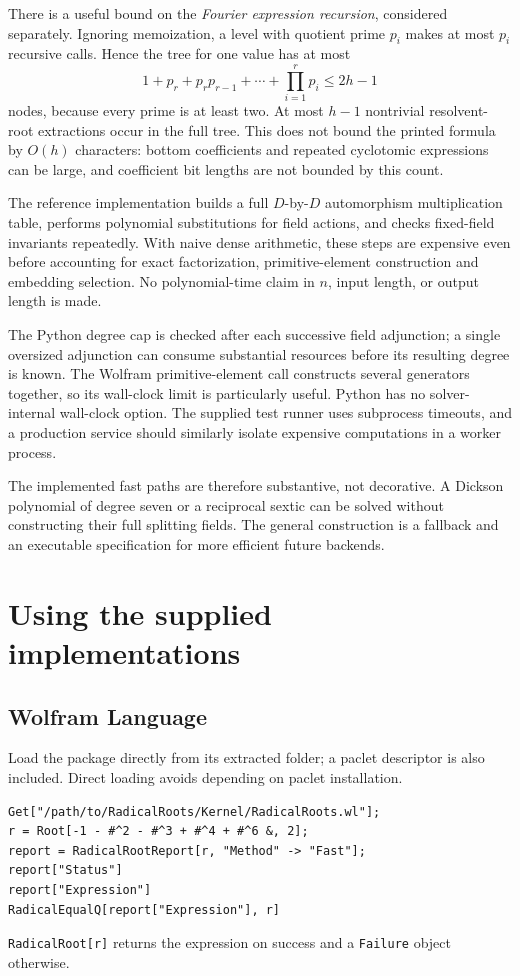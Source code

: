 \documentclass[11pt,letterpaper]{article}
\newcommand{\code}[1]{\texttt{#1}}
\theoremstyle{definition}\newtheorem{definition}[theorem]{Definition}
\theoremstyle{remark}\newtheorem{remark}[theorem]{Remark}
\begin{document}
There is a useful bound on the \emph{Fourier expression recursion}, considered
separately. Ignoring memoization, a level with quotient prime \(p_i\) makes
at most \(p_i\) recursive calls. Hence the tree for one value has at most
\[
 1+p_r+p_rp_{r-1}+\cdots+\prod_{i=1}^r p_i
                   \leq 2h-1
\]
nodes, because every prime is at least two. At most \(h-1\) nontrivial
resolvent-root extractions occur in the full tree. This does not bound the
printed formula by \(O(h)\) characters: bottom coefficients and repeated
cyclotomic expressions can be large, and coefficient bit lengths are not
bounded by this count.

The reference implementation builds a full \(D\)-by-\(D\) automorphism
multiplication table, performs polynomial substitutions for field actions,
and checks fixed-field invariants repeatedly. With naive dense arithmetic,
these steps are expensive even before accounting for exact factorization,
primitive-element construction and embedding selection. No polynomial-time
claim in \(n\), input length, or output length is made.

The Python degree cap is checked after each successive field adjunction;
a single oversized adjunction can consume substantial resources before its
resulting degree is known. The Wolfram primitive-element call constructs
several generators together, so its wall-clock limit is particularly useful.
Python has no solver-internal wall-clock option. The supplied test runner
uses subprocess timeouts, and a production service should similarly isolate
expensive computations in a worker process.

The implemented fast paths are therefore substantive, not decorative. A
Dickson polynomial of degree seven or a reciprocal sextic can be solved
without constructing their full splitting fields. The general construction
is a fallback and an executable specification for more efficient future
backends.

\section{Using the supplied implementations}

\subsection{Wolfram Language}

Load the package directly from its extracted folder; a paclet descriptor is
also included. Direct loading avoids depending on paclet installation.
\begin{lstlisting}
Get["/path/to/RadicalRoots/Kernel/RadicalRoots.wl"];
r = Root[-1 - #^2 - #^3 + #^4 + #^6 &, 2];
report = RadicalRootReport[r, "Method" -> "Fast"];
report["Status"]
report["Expression"]
RadicalEqualQ[report["Expression"], r]
\end{lstlisting}
\code{RadicalRoot[r]} returns the expression on success and a \code{Failure}
object otherwise.
\end{document}
